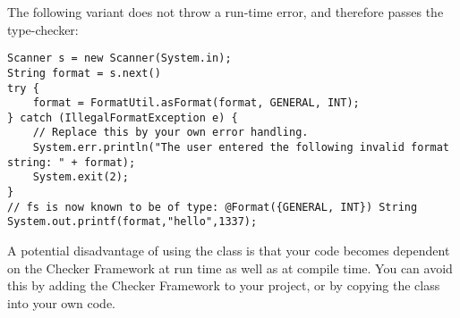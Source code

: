 \noindent The following variant does not throw a run-time error, and
therefore passes the type-checker:

\begin{Verbatim}
Scanner s = new Scanner(System.in);
String format = s.next()
try {
    format = FormatUtil.asFormat(format, GENERAL, INT);
} catch (IllegalFormatException e) {
    // Replace this by your own error handling.
    System.err.println("The user entered the following invalid format string: " + format);
    System.exit(2);
}
// fs is now known to be of type: @Format({GENERAL, INT}) String
System.out.printf(format,"hello",1337);
\end{Verbatim}

\noindent A potential disadvantage of using the  class is that your code becomes
dependent on the Checker Framework at run time as well as at compile time. You
can avoid this by adding the Checker Framework to your project, or by copying
the  class into your own code.

